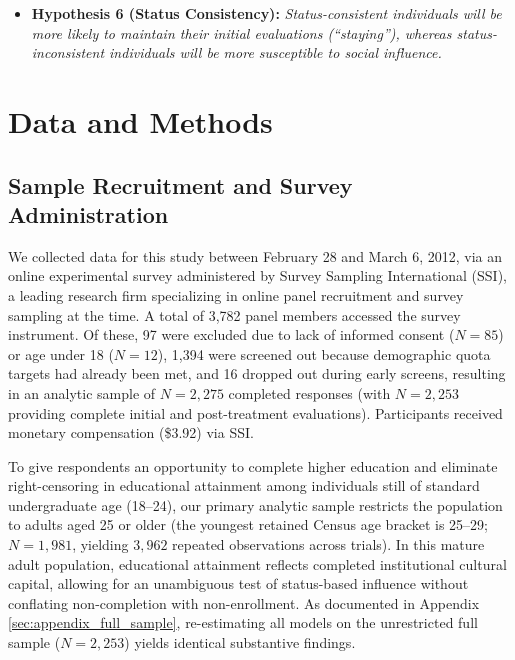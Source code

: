 \documentclass[12pt, letterpaper]{article}
\begin{document}
\begin{itemize}
    \item \textbf{Hypothesis 6 (Status Consistency):} \textit{Status-consistent individuals will be more likely to maintain their initial evaluations (``staying''), whereas status-inconsistent individuals will be more susceptible to social influence.}
\end{itemize}


\section{Data and Methods}

\subsection{Sample Recruitment and Survey Administration}
We collected data for this study between February 28 and March 6, 2012, via an online experimental survey administered by Survey Sampling International (SSI), a leading research firm specializing in online panel recruitment and survey sampling at the time. A total of 3,782 panel members accessed the survey instrument. Of these, 97 were excluded due to lack of informed consent ($N = 85$) or age under 18 ($N = 12$), 1,394 were screened out because demographic quota targets had already been met, and 16 dropped out during early screens, resulting in an analytic sample of $N = 2,275$ completed responses (with $N = 2,253$ providing complete initial and post-treatment evaluations). Participants received monetary compensation (\$3.92) via SSI.

To give respondents an opportunity to complete higher education and eliminate right-censoring in educational attainment among individuals still of standard undergraduate age (18--24), our primary analytic sample restricts the population to adults aged 25 or older (the youngest retained Census age bracket is 25--29; $N = 1,981$, yielding $3,962$ repeated observations across trials). In this mature adult population, educational attainment reflects completed institutional cultural capital, allowing for an unambiguous test of status-based influence without conflating non-completion with non-enrollment. As documented in Appendix \ref{sec:appendix_full_sample}, re-estimating all models on the unrestricted full sample ($N = 2,253$) yields identical substantive findings.
\end{document}
